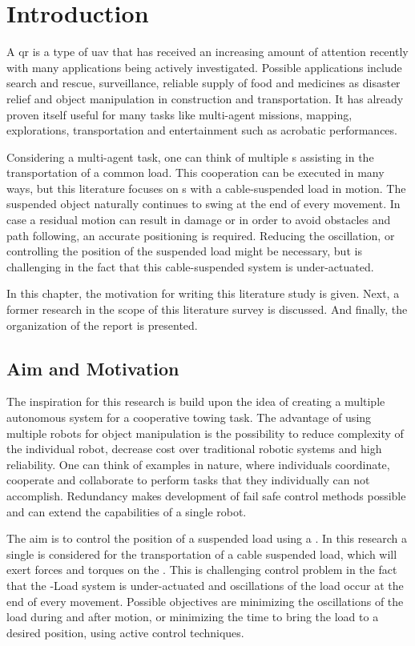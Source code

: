\chapter{Introduction} \label{ch:intro}

A \acf{qr} is a type of \acf{uav} that has received an increasing amount of attention recently with many applications being actively investigated. Possible applications include search and rescue, surveillance, reliable supply of food and medicines as disaster relief and object manipulation in construction and transportation. It has already proven itself useful for many tasks like multi-agent missions, mapping, explorations, transportation and entertainment such as acrobatic performances.

Considering a multi-agent task, one can think of multiple s assisting in the transportation of a common load. This cooperation can be executed in many ways, but this literature focuses on s with a cable-suspended load in motion. The suspended object naturally continues to swing at the end of every movement. In case a residual motion can result in damage or in order to avoid obstacles and path following, an accurate positioning is required. Reducing the oscillation, or controlling the position of the suspended load might be necessary, but is challenging in the fact that this cable-suspended system is under-actuated.

In this chapter, the motivation for writing this literature study is given. Next, a former research in the scope of this literature survey is discussed. And finally, the organization of the report is presented.

\section{Aim and Motivation}\label{sec:int.motivation}
The inspiration for this research is build upon the idea of creating a multiple autonomous  system for a cooperative towing task. The advantage of using multiple robots for object manipulation is the possibility to reduce complexity of the individual robot, decrease cost over traditional robotic systems and high reliability. One can think of examples in nature, where individuals coordinate, cooperate and collaborate to perform tasks that they individually can not accomplish. Redundancy makes development of fail safe control methods possible and can extend the capabilities of a single robot. 						

The aim is to control the position of a suspended load using a . In this research a single  is considered for the transportation of a cable suspended load, which will exert forces and torques on the . This is challenging control problem in the fact that the -Load system is under-actuated and oscillations of the load occur at the end of every movement. Possible objectives are minimizing the oscillations of the load during and after motion, or minimizing the time to bring the load to a desired position, using active control techniques.

